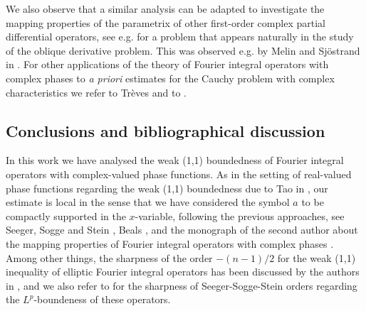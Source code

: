 \documentclass[12pt, reqno]{amsart}
\theoremstyle{definition}
\theoremstyle{remark}
\numberwithin{equation}{section}
\begin{document}
We also observe that a similar analysis can be adapted to investigate the mapping properties of the parametrix of other first-order complex partial differential operators, see e.g. \cite[Page 120]{Ruzhansky:CWI-book} for a problem that appears naturally in the study of the oblique derivative problem. This was observed e.g. by Melin and Sj\"ostrand in \cite{Melin:Sjostrand1975}. For other applications of the theory of Fourier integral operators with complex phases to {\it a priori} estimates for the Cauchy problem with complex characteristics we refer to Trèves \cite[Chapter XI]{Treves:1980:Vol2} and to \cite[Chapter 5]{Ruzhansky:CWI-book}.   

\subsection{Conclusions and bibliographical discussion}

In this work we have analysed the weak (1,1) boundedness of Fourier integral operators with complex-valued phase functions. As in the setting of real-valued phase functions regarding the weak (1,1) boundedness due to Tao in \cite{Tao}, our estimate is local in the sense that we have considered the symbol $a$ to be compactly supported in the $x$-variable, following the previous approaches, see Seeger, Sogge and Stein \cite{SSS}, Beals \cite{Beals1982}, and the monograph of the second author about the mapping properties of Fourier integral operators with complex phases \cite{Ruzhansky:CWI-book}. Among other things, the sharpness of the order $-(n-1)/2$ for the weak (1,1) inequality of elliptic Fourier integral operators has been discussed by the authors in \cite{CardonaRuzhansky:2022}, and we also refer to \cite{Ruzhansky1999} for the sharpness of Seeger-Sogge-Stein orders regarding the $L^p$-boundeness of these operators.      
\end{document}
